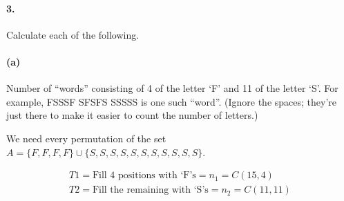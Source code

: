     \paragraph*{3.}
    Calculate each of the following.

    \paragraph*{(a)}
    Number of “words” consisting of 4 of the letter `F' and 11 of the letter `S'. For example, FSSSF SFSFS SSSSS is one such “word”. (Ignore the spaces; they're just there to make it easier to count the number of letters.)

    \begin{mdframed}
        We need every permutation of the set $A = \{F,F,F,F\} \cup \{S,S,S,S,S,S,S,S,S,S,S\}$.
        
        \begin{equation*}
            \begin{gathered}
                T1 = \text{Fill 4 positions with `F's} = n_1 = C(15,4)    \\
                T2 = \text{Fill the remaining with `S's} = n_2 = C(11, 11)
            \end{gathered}
        \end{equation*}
    \end{mdframed}

